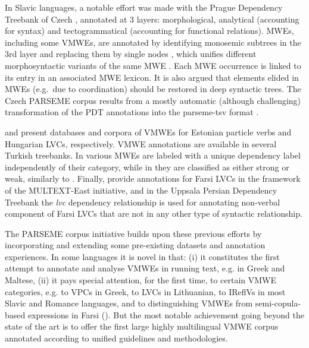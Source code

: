 \documentclass[output=paper,modfonts]{langscibook}
\begin{document}
In Slavic languages, a notable effort was made with the Prague Dependency Treebank of Czech %
\citep{pdt2017}, annotated at 3 layers: morphological, analytical (accounting for syntax) and tectogrammatical (accounting for functional relations). MWEs, including some VMWEs, are annotated by identifying monosemic subtrees in the 3rd layer and replacing them by single nodes \citep{BejcekStranak10}, which unifies different morphosyntactic variants of the same MWE \citep{BejcekStranakZeman11}. Each MWE occurrence is linked to its entry in an associated MWE lexicon.  It is also argued that elements elided in MWEs (e.g.\ due to coordination) should be restored in deep syntactic trees. The Czech PARSEME corpus results from a mostly automatic (although challenging) transformation of the PDT annotations into the parseme-tsv format \citep{biblio:BeHaExtractingVerbal2017}.

\citet{kaalep06,kaalep08} and \citet{Vincze:2010} present databases and corpora of VMWEs for Estonian particle verbs and Hungarian LVCs, respectively. 
VMWE annotations are available in several Turkish treebanks. In \citet{eryigit2015} various MWEs are labeled with a unique dependency label independently of their category, while in \citet{ciclingkubra} they are classified as either strong or weak, similarly to \citet{schneider2014}. 
Finally, \citet{QasemiZadehR06} provide annotations for Farsi LVCs in %
the framework of the MULTEXT-East initiative, 
and in the Uppsala Persian Dependency Treebank \citep{SERAJI14.378} the \emph{lvc} dependency relationship is used for annotating non-verbal component of Farsi LVCs that are not in any other type of syntactic relationship. 

The PARSEME corpus initiative builds upon these previous efforts by incorporating and extending some pre-existing datasets and annotation experiences. In some languages %
it is novel in that: (i) it constitutes the first attempt to annotate and analyse VMWEs in running text, e.g. in Greek and Maltese, %
(ii) it pays special attention, for the first time, to certain VMWE categories, e.g. to VPCs in Greek, to LVCs in Lithuanian, to IReflVs in most Slavic and Romance languages, and to distinguishing VMWEs from semi-copula-based expressions in Farsi ().  
But the most notable achievement going beyond the state of the art is to offer the first large highly multilingual VMWE corpus annotated according to unified guidelines and methodologies.
\end{document}
